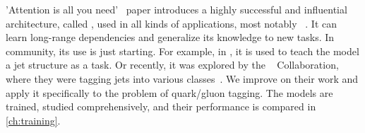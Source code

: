 'Attention is all you need'~\cite{att_is_all} paper introduces a highly successful and influential architecture, called \trans, used in all kinds of applications, most notably \nlp~\cite{bert,gpt3,gpt4,deit3,cait}.
It can learn long-range dependencies and generalize its knowledge to new tasks.
In \HEP community, its use is just starting.
For example, in \cite{qcd_as_nlp}, it is used to teach the model a jet structure as a \nlp task.  
Or recently, it was explored by the \CMS~\cite{cms} Collaboration, where they were tagging jets into various classes~\cite{part}.
We improve on their work and apply it specifically to the problem of quark/gluon tagging.
The models are trained, studied comprehensively, and their performance is compared in \cref{ch:training}.

